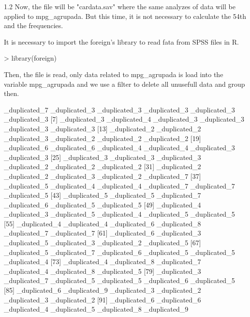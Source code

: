 \documentclass[a4paper]{article}
\begin{document}
	1.2 Now, the file will be "cardata.sav" where the same analyzes of data will be
	applied to mpg_agrupada. But this time, it is not necessary to calculate the 54th and the
	frequencies.
	
	It is necessary to import the foreign's library to read fata from SPSS files in R.
\begin{Schunk}
\begin{Sinput}
> library(foreign)
\end{Sinput}
\end{Schunk}
	Then, the file is read, only data related to mpg_agrupada is load into the variable mpg_agrupada
	and we use a filter to delete all unusefull data and group then.
\begin{Schunk}
\begin{Soutput}
  [1] _duplicated_7  _duplicated_3  _duplicated_3  _duplicated_3  _duplicated_3  _duplicated_3 
  [7] _duplicated_3  _duplicated_4  _duplicated_3  _duplicated_3  _duplicated_3  _duplicated_3 
 [13] _duplicated_2  _duplicated_2  _duplicated_3  _duplicated_2  _duplicated_2  _duplicated_2 
 [19] _duplicated_6  _duplicated_6  _duplicated_4  _duplicated_4  _duplicated_3  _duplicated_3 
 [25] _duplicated_3  _duplicated_3  _duplicated_3  _duplicated_2  _duplicated_2  _duplicated_2 
 [31] _duplicated_2  _duplicated_2                 _duplicated_3  _duplicated_2  _duplicated_7 
 [37] _duplicated_5  _duplicated_4  _duplicated_4  _duplicated_7  _duplicated_7  _duplicated_5 
 [43] _duplicated_5  _duplicated_5  _duplicated_7  _duplicated_6  _duplicated_5  _duplicated_5 
 [49] _duplicated_4  _duplicated_3  _duplicated_5  _duplicated_4  _duplicated_5  _duplicated_5 
 [55] _duplicated_4  _duplicated_4  _duplicated_6  _duplicated_8  _duplicated_7  _duplicated_7 
 [61] _duplicated_6  _duplicated_3  _duplicated_5  _duplicated_3  _duplicated_2  _duplicated_5 
 [67] _duplicated_5  _duplicated_7  _duplicated_6  _duplicated_5  _duplicated_5  _duplicated_4 
 [73] _duplicated_4  _duplicated_8  _duplicated_7  _duplicated_4  _duplicated_8  _duplicated_5 
 [79] _duplicated_3  _duplicated_7  _duplicated_5  _duplicated_5  _duplicated_6  _duplicated_5 
 [85] _duplicated_6  _duplicated_9  _duplicated_3  _duplicated_2  _duplicated_3  _duplicated_2 
 [91] _duplicated_6  _duplicated_6  _duplicated_4  _duplicated_5  _duplicated_8  _duplicated_9 

\end{Soutput}
\end{Schunk}
\end{document}
